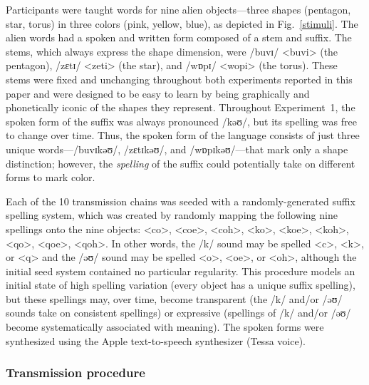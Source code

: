 \documentclass[doc,biblatex]{apa7}
\begin{document}
Participants were taught words for nine alien objects---three shapes (pentagon, star, torus) in three colors (pink, yellow, blue), as depicted in Fig.~\ref{stimuli}. The alien words had a spoken and written form composed of a stem and suffix. The stems, which always express the shape dimension, were /buvɪ/ <buvi> (the pentagon), /zɛtɪ/ <zeti> (the star), and /wɒpɪ/ <wopi> (the torus). These stems were fixed and unchanging throughout both experiments reported in this paper and were designed to be easy to learn by being graphically and phonetically iconic of the shapes they represent. Throughout Experiment~1, the spoken form of the suffix was always pronounced /kəʊ/, but its spelling was free to change over time. Thus, the spoken form of the language consists of just three unique words---/buvɪkəʊ/, /zɛtɪkəʊ/, and /wɒpɪkəʊ/---that mark only a shape distinction; however, the \textit{spelling} of the suffix could potentially take on different forms to mark color.

Each of the 10 transmission chains was seeded with a randomly-generated suffix spelling system, which was created by randomly mapping the following nine spellings onto the nine objects: <co>, <coe>, <coh>, <ko>, <koe>, <koh>, <qo>, <qoe>, <qoh>. In other words, the /k/ sound may be spelled <c>, <k>, or <q> and the /əʊ/ sound may be spelled <o>, <oe>, or <oh>, although the initial seed system contained no particular regularity. This procedure models an initial state of high spelling variation (every object has a unique suffix spelling), but these spellings may, over time, become transparent (the /k/ and/or /əʊ/ sounds take on consistent spellings) or expressive (spellings of /k/ and/or /əʊ/ become systematically associated with meaning). The spoken forms were synthesized using the Apple text-to-speech synthesizer (Tessa voice).

\subsubsection{Transmission procedure}
\end{document}
